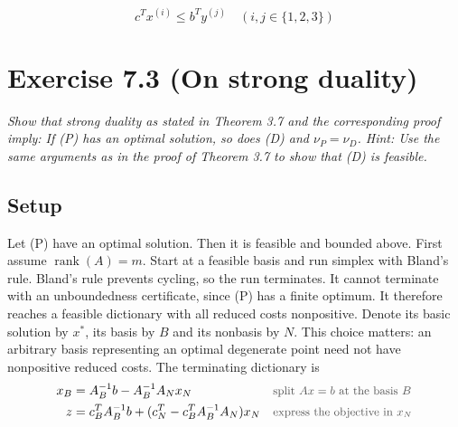 \documentclass[a4paper,11pt]{article}
\newif\ifexplain
\newcommand{\aufgabe}[1]{\section*{#1}}
\newcommand{\angabe}[1]{\textit{#1}\par\smallskip}
\newcommand{\teil}[1]{\subsection*{#1}}
\newcommand{\why}[1]{\text{\small\color{black!65}#1}}
\newcommand{\explain}[1]{\ifexplain\begin{erklbox}#1\end{erklbox}\fi}
\begin{document}
\[\boxed{c^Tx^{(i)}\le b^Ty^{(j)}\quad (i,j\in\{1,2,3\})}\]
\explain{Wie man die primalen Punkte findet: Jede Zeile von $A$ hat die Zeilensumme $4$ gleich der rechten Seite. Kombinationen aus $0,1,2$ mit den passenden Spalten treffen diese Summe. $(1,1,1,1)$ addiert in jeder Zeile alle drei von null verschiedenen Koeffizienten. Bei $(0,2,0,2)$ und $(2,0,2,0)$ werden dagegen nur die jeweils ausgewählten Spalten mit $2$ multipliziert. Bei den dualen Punkten prüft man die vier Ungleichungen einzeln; keine der vier Prüfungen darf ausgelassen werden.}
\explain{$(0,2,0,2)$ hat den Zielfunktionswert $10$, der kleinste duale Wert hier ist $12$. Die Lücke $12-10=2$ ist nur ein Abstand zwischen den gewählten Punkten, keine Dualitätslücke: Nach starker Dualität ist der wahre optimale Wert $10$, erreicht etwa von $y^*=(\tfrac74,-\tfrac32,\tfrac94)$ mit $b^Ty^*=10$. Die schwache Dualität verlangt nur, dass kein primaler Wert einen dualen übertrifft.}

\aufgabe{Exercise 7.3 (On strong duality)}
\angabe{Show that strong duality as stated in Theorem 3.7 and the corresponding proof imply: If (P) has an optimal solution, so does (D) and $\nu_P = \nu_D$. Hint: Use the same arguments as in the proof of Theorem 3.7 to show that (D) is feasible.}

\teil{Setup}
Let (P) have an optimal solution. Then it is feasible and bounded above. First assume $\operatorname{rank}(A)=m$. Start at a feasible basis and run simplex with Bland's rule. Bland's rule prevents cycling, so the run terminates. It cannot terminate with an unboundedness certificate, since (P) has a finite optimum. It therefore reaches a feasible dictionary with all reduced costs nonpositive. Denote its basic solution by $x^*$, its basis by $B$ and its nonbasis by $N$. This choice matters: an arbitrary basis representing an optimal degenerate point need not have nonpositive reduced costs. The terminating dictionary is
\begin{align*}
x_B &= A_B^{-1}b - A_B^{-1}A_Nx_N && \why{split $Ax=b$ at the basis $B$}\\
z &= c_B^TA_B^{-1}b + (c_N^T - c_B^TA_B^{-1}A_N)x_N && \why{express the objective in $x_N$}
\end{align*}
\end{document}
